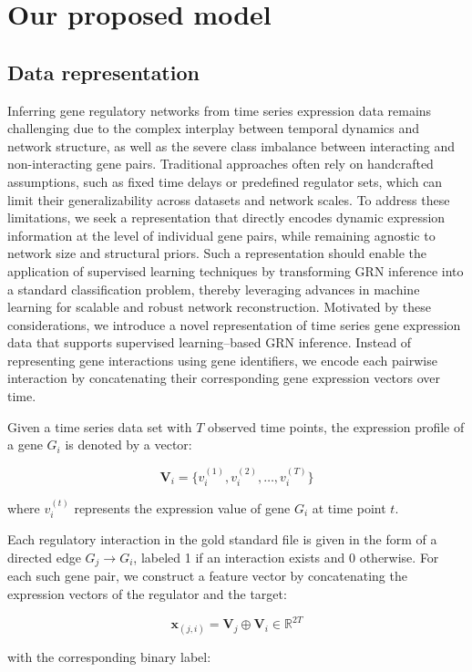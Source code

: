 \section{Our proposed model}

\subsection{Data representation}\label{transformation}
Inferring gene regulatory networks from time series expression data remains challenging due to the complex interplay between temporal dynamics and network structure, as well as the severe class imbalance between interacting and non-interacting gene pairs. Traditional approaches often rely on handcrafted assumptions, such as fixed time delays or predefined regulator sets, which can limit their generalizability across datasets and network scales. To address these limitations, we seek a representation that directly encodes dynamic expression information at the level of individual gene pairs, while remaining agnostic to network size and structural priors. Such a representation should enable the application of supervised learning techniques by transforming GRN inference into a standard classification problem, thereby leveraging advances in machine learning for scalable and robust network reconstruction. Motivated by these considerations, we introduce a novel representation of time series gene expression data that supports supervised learning–based GRN inference. Instead of representing gene interactions using gene identifiers, we encode each pairwise interaction by concatenating their corresponding gene expression vectors over time.

Given a time series data set with $T$ observed time points, the expression profile of a gene $G_i$ is denoted by a vector:

$$
\mathbf{V}_i = \{v_{i}^{(1)}, v_{i}^{(2)}, \ldots, v_{i}^{(T)}\}
$$

where $v_{i}^{(t)}$ represents the expression value of gene $G_i$ at time point $t$.

Each regulatory interaction in the gold standard file is given in the form of a directed edge $G_j \rightarrow G_i$, labeled 1 if an interaction exists and 0 otherwise. For each such gene pair, we construct a feature vector by concatenating the expression vectors of the regulator and the target:

$$
\mathbf{x}_{(j,i)} = \mathbf{V}_j \oplus \mathbf{V}_i \in \mathbb{R}^{2T}
$$

with the corresponding binary label:

